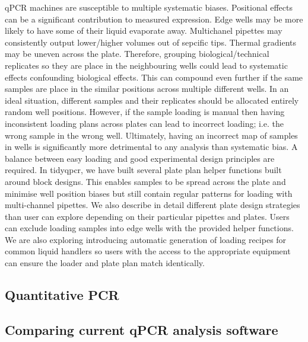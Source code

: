 \documentclass{SBCbookchapter}
\begin{document}
qPCR machines are susceptible to multiple systematic biases. Positional effects can be a significant contribution to measured expression. Edge wells may be more likely to have some of their liquid evaporate away. Multichanel pipettes may consistently output lower/higher volumes out of sepcific tips. Thermal gradients may be uneven across the plate. Therefore, grouping biological/technical replicates so they are place in the neighbouring wells could lead to systematic effects confounding biological effects. This can compound even further if the same samples are place in the similar positions across multiple different wells. In an ideal situation, different samples and their replicates should be allocated entirely random well positions. However, if the sample loading is manual then having inconsistent loading plans across plates can lead to incorrect loading; i.e. the wrong sample in the wrong well. Ultimately, having an incorrect map of samples in wells is significantly more detrimental to any analysis than systematic bias. A balance between easy loading and good experimental design principles are required. In tidyqpcr, we have built several plate plan helper functions built around block designs. This enables samples to be spread across the plate and minimise well position biases but still contain regular patterns for loading with multi-channel pipettes. We also describe in detail different plate design strategies than user can explore depending on their particular pipettes and plates. Users can exclude loading samples into edge wells with the provided helper functions. We are also exploring introducing automatic generation of loading recipes for common liquid handlers so users with the access to the appropriate equipment can ensure the loader and plate plan match identically.



\subsection{Quantitative PCR}

\subsection{Comparing current qPCR analysis software}
\end{document}
